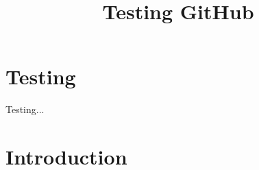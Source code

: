 \documentclass{article}
\title{Testing GitHub}
\author{}
\date{}
\begin{document}
\maketitle

\section{Testing}
Testing...
\section{Introduction}
\lipsum[1-5]
\end{document}
